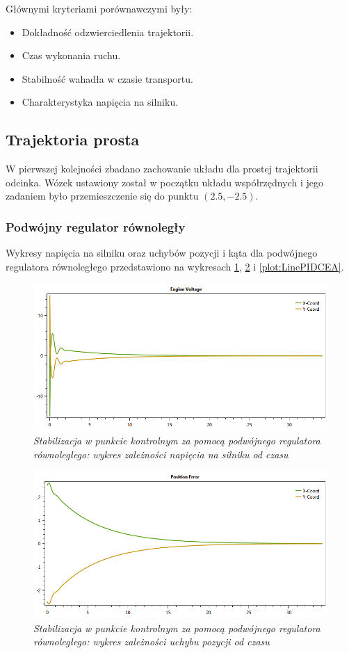 \documentclass[12pt, oneside]{report}
\theoremstyle{definition}
\begin{document}
Głównymi kryteriami porównawczymi były: 
\begin{itemize}
\item Dokładność odzwierciedlenia trajektorii.
\item Czas wykonania ruchu.
\item Stabilność wahadła w czasie transportu.
\item Charakterystyka napięcia na silniku.
\end{itemize}

\subsection{Trajektoria prosta}
W pierwszej kolejności zbadano zachowanie układu dla prostej trajektorii odcinka. Wózek ustawiony został w początku układu współrzędnych i jego zadaniem było przemieszczenie się do punktu $(2.5,-2.5)$.

\subsubsection{Podwójny regulator równoległy}
Wykresy napięcia na silniku oraz uchybów pozycji i kąta dla podwójnego regulatora równoległego przedstawiono na wykresach \ref{plot:LinePIDEV}, \ref{plot:LinePIDCEP} i \ref{plot:LinePIDCEA}.

\begin{figure}[H]
	\centering
		\includegraphics[width = 350pt]{LinePIDEV} 
		\caption{\textit{Stabilizacja w punkcie kontrolnym za pomocą podwójnego regulatora równoległego: wykres zależności napięcia na silniku od czasu}}
		\label{plot:LinePIDEV}
\end{figure}

\begin{figure}[H]
	\centering
		\includegraphics[width = 350pt]{LinePIDCEP} 
		\caption{\textit{Stabilizacja w punkcie kontrolnym za pomocą podwójnego regulatora równoległego: wykres zależności uchybu pozycji od czasu}}
		\label{plot:LinePIDCEP}
\end{figure}
\end{document}
